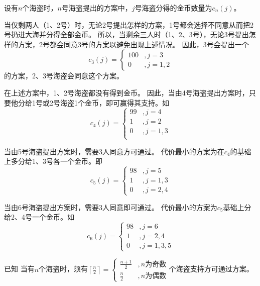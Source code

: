 \begin{questions}
    \begin{solution}
        设有$n$个海盗时，$n$号海盗提出的方案中，$j$号海盗分得的金币数量为$c_n(j)$。

        当仅剩两人（1、2号）时，无论2号提出怎样的方案，1号都会选择不同意从而把2号扔进大海并分得全部金币。
        所以，当剩余三人时（1、2、3号），无论3号提出怎样的方案，2号都会同意3号的方案以避免出现上述情况。
        因此，3号会提出一个$$
            c_3(j) = \begin{cases}
                100 & , j=3   \\
                0   & , j=1,2
            \end{cases}
        $$的方案，2、3号海盗会同意这个方案。

        在上述方案中，1、2号海盗都没有得到金币。
        因此，当由4号海盗提出方案时，只要他分给1号或2号海盗1个金币，即可赢得其支持。如$$
            c_4(j) = \begin{cases}
                99 & , j=4   \\
                1  & , j=2   \\
                0  & , j=1,3 \\
            \end{cases}
        $$

        当由5号海盗提出方案时，需要3人同意方可通过。
        代价最小的方案为在$c_4$的基础上多分给1、3号各一个金币。即$$
            c_5(j) = \begin{cases}
                98 & , j=5   \\
                1  & , j=1,3 \\
                0  & , j=2,4
            \end{cases}
        $$

        当由6号海盗提出方案时，需要3人同意即可通过。
        代价最小的方案为$c_5$基础上分给2、4号一个金币。如$$
            c_6(j) = \begin{cases}
                98 & , j=6     \\
                1  & , j=2,4   \\
                0  & , j=1,3,5
            \end{cases}
        $$

        \textsf{已知} \quad 当有$n$个海盗时，须有$
            \left\lceil \frac{n}{2} \right\rceil = \begin{cases}
                \frac{n+1}{2} & , n \text{为奇数} \\
                \frac{n}{2}   & , n \text{为偶数}
            \end{cases}
        $个海盗支持方可通过方案。


\end{solution}
\end{questions}
